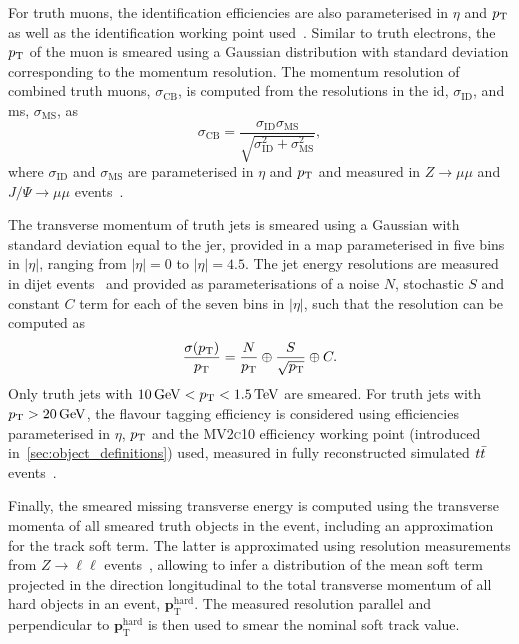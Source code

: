 For truth muons, the identification efficiencies are also parameterised in $\eta$ and $p_{\textrm{T}}$ as well as the identification working point used~\cite{Aad:2020gmm}. Similar to truth electrons, the  $p_{\textrm{T}}$ of the muon is smeared using a Gaussian distribution with standard deviation corresponding to the momentum resolution. The momentum resolution of combined truth muons, $\sigma_\mathrm{CB}$, is computed from the resolutions in the \gls{id}, $\sigma_\mathrm{ID}$, and \gls{ms}, $\sigma_\mathrm{MS}$, as
\begin{equation}
	\sigma_\mathrm{CB} = \frac{\sigma_\mathrm{ID}\sigma_\mathrm{MS}}{\sqrt{\sigma_\mathrm{ID}^2 + \sigma_\mathrm{MS}^2}},
\end{equation}
where $\sigma_\mathrm{ID}$ and $\sigma_\mathrm{MS}$ are parameterised in $\eta$ and $p_{\textrm{T}}$ and measured in $Z\to \mu\mu$ and $J/\Psi\to \mu\mu$ events~\cite{PERF-2015-10}.

The transverse momentum of truth jets is smeared using a Gaussian with standard deviation equal to the \gls{jer}, provided in a map parameterised in five bins in $\vert\eta\vert$, ranging from $\vert\eta\vert = 0$ to $\vert\eta\vert = 4.5$. The jet energy resolutions are measured in dijet events~\cite{Aad:2020flx} and provided as parameterisations of a noise $N$, stochastic $S$ and constant $C$ term for each of the seven bins in $\vert\eta\vert$, such that the resolution can be computed as
\begin{equation}
	\frac{\sigma(p_{\textrm{T}})}{p_{\textrm{T}}} = \frac{N}{p_{\textrm{T}}}\oplus\frac{S}{\sqrt{p_{\textrm{T}}}}\oplus C.
\end{equation}
Only truth jets with $\SI{10}{\GeV} < \pt < \SI{1.5}{\TeV}$ are smeared. For truth jets with $\pt > \SI{20}{\GeV}$, the flavour tagging efficiency is considered using efficiencies parameterised in $\eta$, $p_{\textrm{T}}$ and the \textsc{MV2c10} efficiency working point (introduced in~\cref{sec:object_definitions}) used, measured in fully reconstructed simulated $t\bar{t}$ events~\cite{FTAG-2018-01}.

Finally, the smeared missing transverse energy is computed using the transverse momenta of all smeared truth objects in the event, including an approximation for the track soft term. The latter is approximated using resolution measurements from $Z\rightarrow \ell\ell$ events~\cite{ATLAS-CONF-2018-023}, allowing to infer a distribution of the mean soft term projected in the direction longitudinal to the total transverse momentum of all hard objects in an event, $\boldsymbol{p}_\mathrm{T}^\mathrm{hard}$. The measured resolution parallel and perpendicular to $\boldsymbol{p}_\mathrm{T}^\mathrm{hard}$ is then used to smear the nominal soft track value.
 
